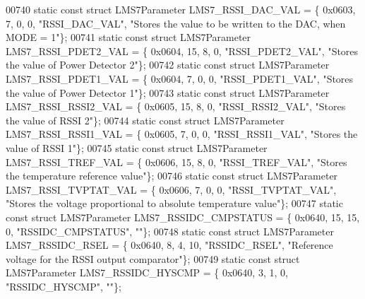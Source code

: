 \begin{DoxyCode}
00740 \textcolor{keyword}{static} \textcolor{keyword}{const} \textcolor{keyword}{struct }LMS7Parameter LMS7_RSSI_DAC_VAL = \{ 0x0603, 7, 0, 0, \textcolor{stringliteral}{"RSSI\_DAC\_VAL"}, \textcolor{stringliteral}{"Stores the value
       to be written to the DAC, when MODE = 1"}\};
00741 \textcolor{keyword}{static} \textcolor{keyword}{const} \textcolor{keyword}{struct }LMS7Parameter LMS7_RSSI_PDET2_VAL = \{ 0x0604, 15, 8, 0, \textcolor{stringliteral}{"RSSI\_PDET2\_VAL"}, \textcolor{stringliteral}{"Stores the
       value of Power Detector 2"}\};
00742 \textcolor{keyword}{static} \textcolor{keyword}{const} \textcolor{keyword}{struct }LMS7Parameter LMS7_RSSI_PDET1_VAL = \{ 0x0604, 7, 0, 0, \textcolor{stringliteral}{"RSSI\_PDET1\_VAL"}, \textcolor{stringliteral}{"Stores the
       value of Power Detector 1"}\};
00743 \textcolor{keyword}{static} \textcolor{keyword}{const} \textcolor{keyword}{struct }LMS7Parameter LMS7_RSSI_RSSI2_VAL = \{ 0x0605, 15, 8, 0, \textcolor{stringliteral}{"RSSI\_RSSI2\_VAL"}, \textcolor{stringliteral}{"Stores the
       value of RSSI 2"}\};
00744 \textcolor{keyword}{static} \textcolor{keyword}{const} \textcolor{keyword}{struct }LMS7Parameter LMS7_RSSI_RSSI1_VAL = \{ 0x0605, 7, 0, 0, \textcolor{stringliteral}{"RSSI\_RSSI1\_VAL"}, \textcolor{stringliteral}{"Stores the
       value of RSSI 1"}\};
00745 \textcolor{keyword}{static} \textcolor{keyword}{const} \textcolor{keyword}{struct }LMS7Parameter LMS7_RSSI_TREF_VAL = \{ 0x0606, 15, 8, 0, \textcolor{stringliteral}{"RSSI\_TREF\_VAL"}, \textcolor{stringliteral}{"Stores the
       temperature reference value"}\};
00746 \textcolor{keyword}{static} \textcolor{keyword}{const} \textcolor{keyword}{struct }LMS7Parameter LMS7_RSSI_TVPTAT_VAL = \{ 0x0606, 7, 0, 0, \textcolor{stringliteral}{"RSSI\_TVPTAT\_VAL"}, \textcolor{stringliteral}{"Stores the
       voltage proportional to absolute temperature value"}\};
00747 \textcolor{keyword}{static} \textcolor{keyword}{const} \textcolor{keyword}{struct }LMS7Parameter LMS7_RSSIDC_CMPSTATUS = \{ 0x0640, 15, 15, 0, \textcolor{stringliteral}{"RSSIDC\_CMPSTATUS"}, \textcolor{stringliteral}{""}\};
00748 \textcolor{keyword}{static} \textcolor{keyword}{const} \textcolor{keyword}{struct }LMS7Parameter LMS7_RSSIDC_RSEL = \{ 0x0640, 8, 4, 10, \textcolor{stringliteral}{"RSSIDC\_RSEL"}, \textcolor{stringliteral}{"Reference voltage
       for the RSSI output comparator"}\};
00749 \textcolor{keyword}{static} \textcolor{keyword}{const} \textcolor{keyword}{struct }LMS7Parameter LMS7_RSSIDC_HYSCMP = \{ 0x0640, 3, 1, 0, \textcolor{stringliteral}{"RSSIDC\_HYSCMP"}, \textcolor{stringliteral}{""}\};

\end{DoxyCode}
